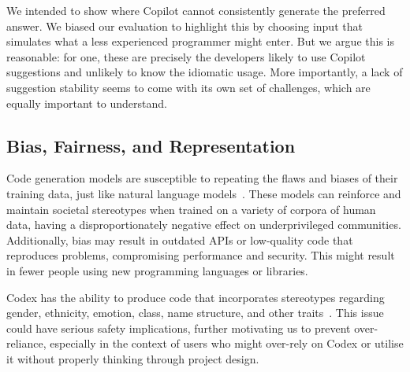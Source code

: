 We intended to show where Copilot cannot consistently generate the preferred answer. We biased our evaluation to highlight this by choosing input that simulates what a less experienced programmer might enter. 
But we argue this is reasonable: for one, these are precisely the developers likely to use Copilot suggestions and unlikely to know the idiomatic usage.
More importantly, a lack of suggestion stability seems to come with its own set of challenges, which are equally important to understand.

\subsection{Bias, Fairness, and Representation}
Code generation models are susceptible to repeating the flaws and biases of their training data, just like natural language models~\cite{Gpt3}. These models can reinforce and maintain societal stereotypes when trained on a variety of corpora of human data, having a disproportionately negative effect on underprivileged communities. 
Additionally, bias may result in outdated APIs or low-quality code that reproduces problems, compromising performance and security. This might result in fewer people using new programming languages or libraries.

Codex has the ability to produce code that incorporates stereotypes regarding gender, ethnicity, emotion, class, name structure, and other traits~\cite{copilot}.
This issue could have serious safety implications, further motivating us to prevent over-reliance, especially in the context of users who might over-rely on Codex or utilise it without properly thinking through project design.

%
